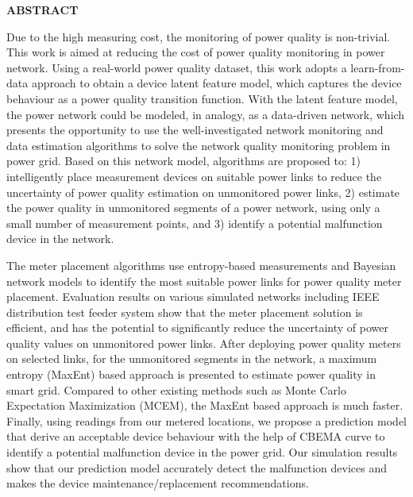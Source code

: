 \newpage
{}


\begin{center}
\textbf{ABSTRACT}
\end{center}

Due to the high measuring cost, the monitoring of power quality is non-trivial. This work is aimed at reducing the cost of power quality monitoring in power network. Using a real-world power quality dataset, this work adopts a learn-from-data approach to obtain a device latent feature model, which captures the device behaviour as a power quality transition function. With the latent feature model, the power network could be modeled, in analogy, as a data-driven network, which presents the opportunity to use the well-investigated network monitoring and data estimation algorithms to solve the network quality monitoring problem in power grid. Based on this network model, algorithms are proposed to: 1) intelligently place measurement devices on suitable power links to reduce the uncertainty of power quality estimation on unmonitored power links, 2) estimate the power quality in unmonitored segments of a power network, using only a small number of measurement points, and 3) identify a potential malfunction device in the network.

The meter placement algorithms use entropy-based measurements and Bayesian network models to identify the most suitable power links for power quality meter placement. Evaluation results on various simulated networks including IEEE distribution test feeder system show that the meter placement solution is efficient, and has the potential to significantly reduce the uncertainty of power quality values on unmonitored power links. After deploying power quality meters on selected links, for the unmonitored segments in the network, a maximum entropy (MaxEnt) based approach is presented to estimate power quality in smart grid. Compared to other existing methods such as Monte Carlo Expectation Maximization (MCEM), the MaxEnt based approach is much faster. Finally, using readings from our metered locations, we propose a prediction model that derive an acceptable device behaviour with the help of CBEMA curve to identify a potential malfunction device in the power grid. Our simulation results show that our prediction model accurately detect the malfunction devices and makes the device maintenance/replacement recommendations.
